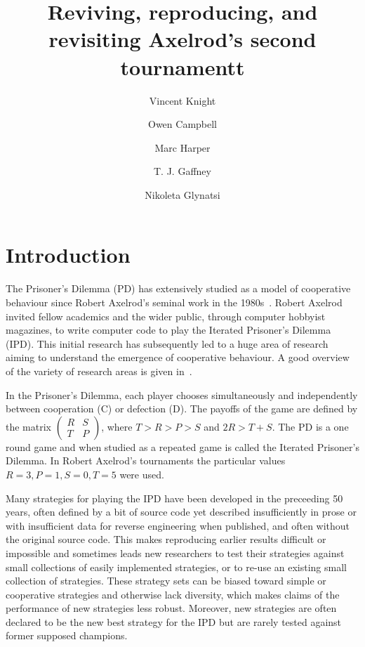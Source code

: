 \documentclass{article}
\title{Reviving, reproducing, and revisiting Axelrod's second tournamentt}
\author{Vincent Knight \and Owen Campbell \and Marc Harper \and T. J. Gaffney \and Nikoleta Glynatsi}
\begin{document}
\maketitle

\section{Introduction}\label{sec:introduction}

The Prisoner's Dilemma (PD) has extensively studied as a model of cooperative behaviour
since Robert Axelrod's seminal work in the 1980s~\cite{Axelrod1980a,
Axelrod1980b, Axelrodbook}. Robert Axelrod invited fellow
academics and the wider public, through computer hobbyist magazines,
to write computer code to play the Iterated Prisoner's Dilemma (IPD). This initial research
has subsequently led to a huge area
of research aiming to understand the emergence of cooperative behaviour. A good
overview of the variety of research areas is given in~\cite{Nowak2006}.

In the Prisoner's Dilemma, each player chooses simultaneously and independently
between cooperation (C) or defection (D). The payoffs of
the game are defined by the matrix
\(
\begin{pmatrix}
    R & S \\ 
    T & P
\end{pmatrix}
\),
where $T > R > P > S$ and $2R > T + S$. The PD is a one
round game and when studied as a repeated game is called
the Iterated Prisoner's Dilemma. In Robert Axelrod's tournaments the particular values \(R=3, P=1, S=0, T=5\)
were used.  

Many strategies for playing the IPD have been developed in the preceeding 50 years,
often defined by a bit of source code yet described insufficiently in prose or with insufficient
data for reverse engineering when published, and often without the original source code.
This makes reproducing earlier results difficult or impossible and sometimes leads new researchers
to test their strategies against small collections of easily implemented strategies, or to
re-use an existing small collection of strategies. These strategy sets can be biased toward simple or
cooperative strategies and otherwise lack diversity, which makes claims of the performance
of new strategies less robust. Moreover, new
strategies are often declared to be the new best strategy for the IPD but are rarely tested
against former supposed champions.
\end{document}
